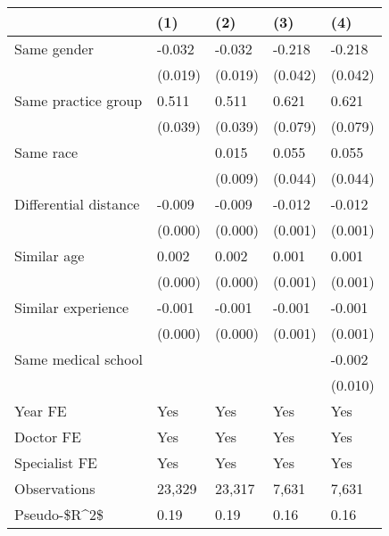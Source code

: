 \begin{tabular}{lllll}
\hline
& (1) & (2) & (3) & (4) \\ \hline
Same gender                        & -0.032  & -0.032  & -0.218  & -0.218  \\
& (0.019) & (0.019) & (0.042) & (0.042) \\
Same practice group                & 0.511   & 0.511   & 0.621   & 0.621   \\
& (0.039) & (0.039) & (0.079) & (0.079) \\
Same race                          &         & 0.015   & 0.055   & 0.055   \\
&         & (0.009) & (0.044) & (0.044) \\
Differential distance              & -0.009  & -0.009  & -0.012  & -0.012  \\
& (0.000) & (0.000) & (0.001) & (0.001) \\
Similar age                        & 0.002   & 0.002   & 0.001   & 0.001   \\
& (0.000) & (0.000) & (0.001) & (0.001) \\
Similar experience                 & -0.001  & -0.001  & -0.001  & -0.001  \\
& (0.000) & (0.000) & (0.001) & (0.001) \\
Same medical school                &         &         &         & -0.002  \\
&         &         &         & (0.010) \\
Year FE                            & Yes     & Yes     & Yes     & Yes     \\
Doctor FE                          & Yes     & Yes     & Yes     & Yes     \\
Specialist FE                      & Yes     & Yes     & Yes     & Yes     \\
Observations                       & 23,329  & 23,317  & 7,631   & 7,631   \\
Pseudo-\$R\textasciicircum{}2\$ & 0.19    & 0.19    & 0.16    & 0.16    \\
\hline
\end{tabular}
